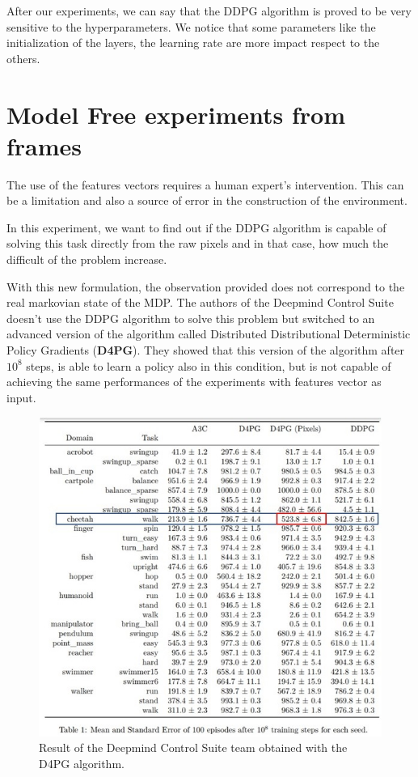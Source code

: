 After our experiments, we can say that the DDPG algorithm is proved to be very sensitive to the hyperparameters.
We notice that some parameters like the initialization of the layers, the learning rate are more impact respect to the others.




\section{Model Free experiments from frames}
The use of the features vectors requires a human expert's intervention. This can be a limitation and also a source of error in the construction of the environment.

In this experiment, we want to find out if the DDPG algorithm is capable of solving this task directly from the raw pixels and in that case, how much the difficult of the problem increase.

With this new formulation, the observation provided does not correspond to the real markovian state of the MDP.
The authors of the Deepmind Control Suite doesn't use the DDPG algorithm to solve this problem but switched to an advanced version of the algorithm called  Distributed Distributional Deterministic Policy Gradients (\textbf{D4PG}).
They showed that this version of the algorithm after $10^8$ steps, is able to learn a policy also in this condition, but is not capable of achieving the same performances of the experiments with features vector as input. 

\begin{figure}[H]
\centering
\includegraphics[width=.75 \textwidth, height=.45 \textheight]{pictures/dmcs_d4pg}
\caption{ Result of the Deepmind Control Suite team obtained with the D4PG algorithm\cite{tassa2018deepmind}.}
\end{figure}

